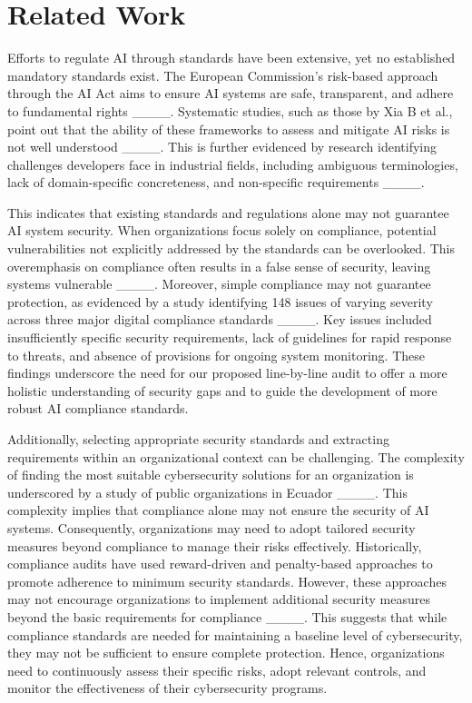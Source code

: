 \section{Related Work}
\label{sec:existing_ai_security}
Efforts to regulate AI through standards have been extensive, yet no established mandatory standards exist. The European Commission's risk-based approach through the AI Act aims to ensure AI systems are safe, transparent, and adhere to fundamental rights ____. Systematic studies, such as those by Xia B et al., point out that the ability of these frameworks to assess and mitigate AI risks is not well understood ____. This is further evidenced by research identifying challenges developers face in industrial fields, including ambiguous terminologies, lack of domain-specific concreteness, and non-specific requirements ____.

This indicates that existing standards and regulations alone may not guarantee AI system security. When organizations focus solely on compliance, potential vulnerabilities not explicitly addressed by the standards can be overlooked. This overemphasis on compliance often results in a false sense of security, leaving systems vulnerable ____. Moreover, simple compliance may not guarantee protection, as evidenced by a study identifying 148 issues of varying severity across three major digital compliance standards ____. Key issues included insufficiently specific security requirements, lack of guidelines for rapid response to threats, and absence of provisions for ongoing system monitoring. These findings underscore the need for our proposed line-by-line audit to offer a more holistic understanding of security gaps and to guide the development of more robust AI compliance standards.

Additionally, selecting appropriate security standards and extracting requirements within an organizational context can be challenging. The complexity of finding the most suitable cybersecurity solutions for an organization is underscored by a study of public organizations in Ecuador ____. This complexity implies that compliance alone may not ensure the security of AI systems. Consequently, organizations may need to adopt tailored security measures beyond compliance to manage their risks effectively. Historically, compliance audits have used reward-driven and penalty-based approaches to promote adherence to minimum security standards. However, these approaches may not encourage organizations to implement additional security measures beyond the basic requirements for compliance ____. This suggests that while compliance standards are needed for maintaining a baseline level of cybersecurity, they may not be sufficient to ensure complete protection. Hence, organizations need to continuously assess their specific risks, adopt relevant controls, and monitor the effectiveness of their cybersecurity programs.

